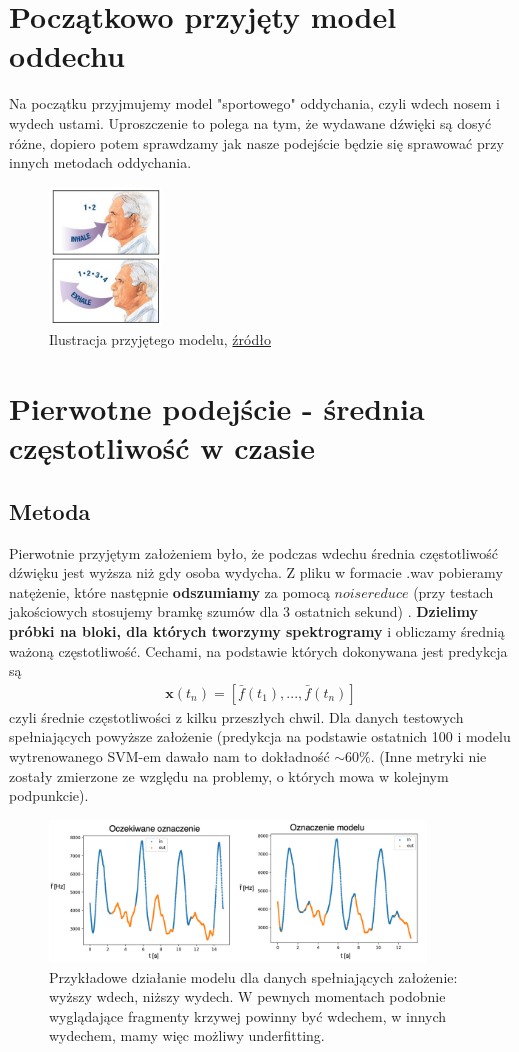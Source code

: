 \documentclass[polish]{article}
\begin{document}
\section{Początkowo przyjęty model oddechu}
Na początku przyjmujemy model "sportowego" oddychania, czyli wdech nosem i wydech ustami.
Uproszczenie to polega na tym, że wydawane dźwięki są dosyć różne, dopiero potem sprawdzamy jak nasze podejście będzie się sprawować
przy innych metodach oddychania.
\begin{figure}[H]
	\centering
	\includegraphics[width=3cm]{model_oddechu}
  	\caption{Ilustracja przyjętego modelu,  \href{https://www.quora.com/Should-I-exhale-from-the-mouth-or-nose-while-deep-breathing}{źródło}}
\end{figure}
\section{Pierwotne podejście - średnia częstotliwość w czasie}
\subsection{Metoda}
Pierwotnie przyjętym założeniem było, że podczas wdechu średnia częstotliwość dźwięku jest wyższa niż
gdy osoba wydycha. Z pliku w formacie .wav pobieramy natężenie, które następnie \textbf{odszumiamy} za pomocą $noisereduce$ (przy testach jakościowych stosujemy bramkę szumów dla 3 ostatnich sekund) . 
\textbf{Dzielimy próbki na bloki, dla których tworzymy spektrogramy} i obliczamy
średnią ważoną częstotliwość.
Cechami, na podstawie których dokonywana jest predykcja są  
\begin{gather*}
\boldsymbol x (t_n) = [\bar{f}(t_1), ..., \bar{f}(t_n)]
\end{gather*}
czyli średnie częstotliwości z kilku przeszłych chwil.
Dla danych testowych spełniających powyższe założenie (predykcja na podstawie ostatnich 100 i modelu wytrenowanego SVM-em dawało nam to dokładność $\sim 60\%$.
(Inne metryki nie zostały zmierzone ze względu na problemy, o których mowa w kolejnym podpunkcie).
\begin{figure}[H]
	\centering
	\includegraphics[width=10cm]{porownanie_srednie}
	\caption{Przykładowe działanie modelu dla danych spełniających założenie: wyższy wdech, niższy wydech.
	W pewnych momentach podobnie wyglądające fragmenty krzywej powinny być wdechem, w innych wydechem, mamy więc możliwy underfitting.}
\end{figure}
\end{document}
